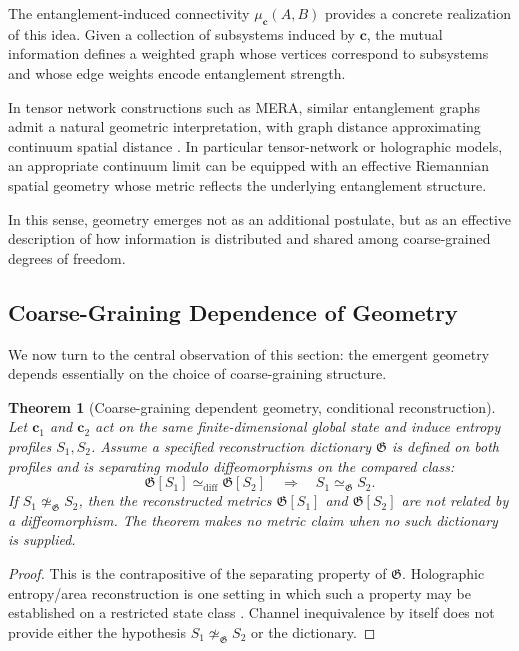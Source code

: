 \documentclass[12pt,a4paper,openany]{book}
\newtheorem{theorem}{Theorem}[chapter]
\begin{document}
The entanglement-induced connectivity $\mu_{\mathbf{c}}(A,B)$ provides a concrete realization of this idea.
Given a collection of subsystems induced by $\mathbf{c}$, the mutual information defines a weighted graph whose vertices correspond to subsystems and whose edge weights encode entanglement strength.

In tensor network constructions such as MERA, similar entanglement graphs admit a natural geometric interpretation, with graph distance approximating continuum spatial distance \cite{Swingle2012}.
In particular tensor-network or holographic models, an appropriate continuum limit can be equipped with an effective Riemannian spatial geometry whose metric reflects the underlying entanglement structure.

In this sense, geometry emerges not as an additional postulate, but as an effective description of how information is distributed and shared among coarse-grained degrees of freedom.

\subsection{Coarse-Graining Dependence of Geometry}

We now turn to the central observation of this section: the emergent geometry depends essentially on the choice of coarse-graining structure.

\begin{theorem}[Coarse-graining dependent geometry, conditional reconstruction]
\label{A-thm:geom}
Let $\mathbf{c}_1$ and $\mathbf{c}_2$ act on the same finite-dimensional global state and induce entropy profiles $S_1,S_2$.  Assume a specified reconstruction dictionary $\mathfrak G$ is defined on both profiles and is separating modulo diffeomorphisms on the compared class:
\[
\mathfrak G[S_1]\simeq_{\mathrm{diff}}\mathfrak G[S_2]
\quad\Longrightarrow\quad
S_1\simeq_{\mathfrak G}S_2.
\]
If $S_1\not\simeq_{\mathfrak G}S_2$, then the reconstructed metrics $\mathfrak G[S_1]$ and $\mathfrak G[S_2]$ are not related by a diffeomorphism.  The theorem makes no metric claim when no such dictionary is supplied.
\end{theorem}

\begin{proof}
This is the contrapositive of the separating property of $\mathfrak G$.  Holographic entropy/area reconstruction is one setting in which such a property may be established on a restricted state class \cite{RyuTakayanagi2006}.  Channel inequivalence by itself does not provide either the hypothesis $S_1\not\simeq_{\mathfrak G}S_2$ or the dictionary.
\end{proof}
\end{document}
